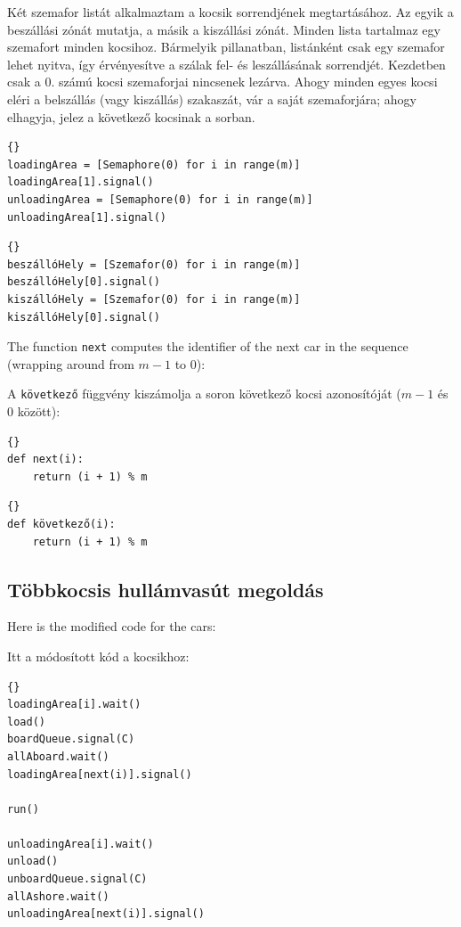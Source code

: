 \documentclass{book}
\newcommand{\clearemptydoublepage}{\newpage\cleardoublepage}
\begin{document}
Két szemafor listát alkalmaztam a kocsik sorrendjének megtartásához. Az egyik a beszállási
zónát mutatja, a másik a kiszállási zónát. Minden lista tartalmaz egy szemafort minden
kocsihoz. Bármelyik pillanatban, listánként csak egy szemafor lehet nyitva, így
érvényesítve a szálak fel- és leszállásának sorrendjét. Kezdetben csak a 0. számú kocsi szemaforjai
nincsenek lezárva. Ahogy minden egyes kocsi eléri a belszállás (vagy kiszállás) szakaszát, vár a saját
szemaforjára; ahogy elhagyja, jelez a következő kocsinak a sorban.

\begin{lstlisting}[title={Multi-car Roller Coaster hint}]{}
loadingArea = [Semaphore(0) for i in range(m)]
loadingArea[1].signal()
unloadingArea = [Semaphore(0) for i in range(m)]
unloadingArea[1].signal()
\end{lstlisting}

\begin{lstlisting}[title={Többkocsis hullámvasút tipp}]{}
beszállóHely = [Szemafor(0) for i in range(m)]
beszállóHely[0].signal()
kiszállóHely = [Szemafor(0) for i in range(m)]
kiszállóHely[0].signal()
\end{lstlisting}

The function {\tt next} computes the identifier of the next
car in the sequence (wrapping around from $m-1$ to 0):

A {\tt következő} függvény kiszámolja a soron következő kocsi azonosítóját ($m-1$ és 0 között):

\begin{lstlisting}[title={Implementation of {\tt next}}]{}
def next(i):
    return (i + 1) % m
\end{lstlisting}

\begin{lstlisting}[title={{\tt következő} implementációja}]{}
def következő(i):
    return (i + 1) % m
\end{lstlisting}



\clearemptydoublepage
\subsection{Többkocsis hullámvasút megoldás}

Here is the modified code for the cars:

Itt a módosított kód a kocsikhoz:

\begin{lstlisting}[title={Multi-car Roller Coaster solution (car)}]{}
loadingArea[i].wait()
load()
boardQueue.signal(C)
allAboard.wait()
loadingArea[next(i)].signal()

run()

unloadingArea[i].wait()
unload()
unboardQueue.signal(C)
allAshore.wait()
unloadingArea[next(i)].signal()
\end{lstlisting}
\end{document}
